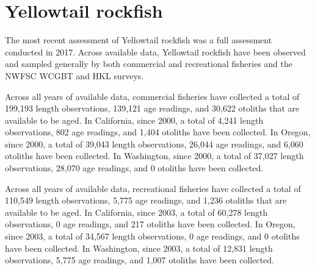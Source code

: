 \documentclass[11pt,
  english,
  letterpaper,
]{article}
\begin{document}

\hypertarget{yellowtail-rockfish}{%
\section{Yellowtail rockfish}\label{yellowtail-rockfish}}

\leavevmode\tagmcend\tagstructend


The most recent assessment of Yellowtail rockfish was a full assessment conducted in 2017. Across available data, Yellowtail rockfish have been observed and sampled generally by both commercial and recreational fisheries and the NWFSC WCGBT and HKL surveys.

\leavevmode\tagmcend\tagstructend\par


Across all years of available data, commercial fisheries have collected a total of 199,193 length observations, 139,121 age readings, and 30,622 otoliths that are available to be aged. In California, since 2000, a total of 4,241 length observations, 802 age readings, and 1,404 otoliths have been collected. In Oregon, since 2000, a total of 39,043 length observations, 26,044 age readings, and 6,060 otoliths have been collected. In Washington, since 2000, a total of 37,027 length observations, 28,070 age readings, and 0 otoliths have been collected.

\leavevmode\tagmcend\tagstructend\par


Across all years of available data, recreational fisheries have collected a total of 110,549 length observations, 5,775 age readings, and 1,236 otoliths that are available to be aged. In California, since 2003, a total of 60,278 length observations, 0 age readings, and 217 otoliths have been collected. In Oregon, since 2003, a total of 34,567 length observations, 0 age readings, and 0 otoliths have been collected. In Washington, since 2003, a total of 12,831 length observations, 5,775 age readings, and 1,007 otoliths have been collected.

\leavevmode\tagmcend\tagstructend\par

\end{document}
